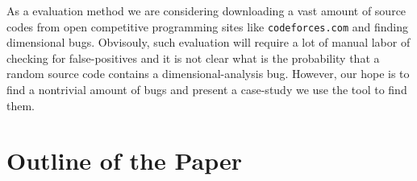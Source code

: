 \documentclass[12pt]{article}
\begin{document}
As a evaluation method we are considering downloading a vast amount of source codes from open competitive programming sites like \texttt{codeforces.com} and finding dimensional bugs. Obvisouly, such evaluation will require a lot of manual labor of checking for false-positives and it is not clear what is the probability that a random source code contains a dimensional-analysis bug. However, our hope is to find a nontrivial amount of bugs and present a case-study we use the tool to find them.

\section{Outline of the Paper}




\end{document}

